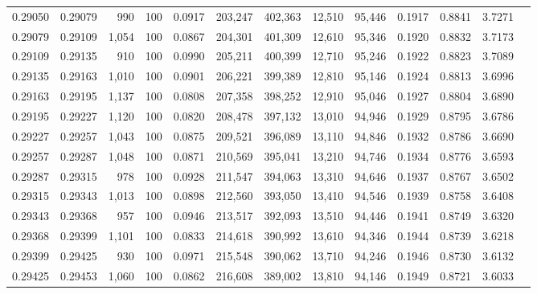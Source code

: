 \begin{tabular}{rrrrrrrrrrrrr}
0.29050 & 0.29079 &   990 & 100 &                                     0.0917 & 203,247 & 402,363 &  12,510 &  95,446 & 0.1917 & 0.8841 & 3.7271 \\
0.29079 & 0.29109 & 1,054 & 100 &                                     0.0867 & 204,301 & 401,309 &  12,610 &  95,346 & 0.1920 & 0.8832 & 3.7173 \\
0.29109 & 0.29135 &   910 & 100 &                                     0.0990 & 205,211 & 400,399 &  12,710 &  95,246 & 0.1922 & 0.8823 & 3.7089 \\
0.29135 & 0.29163 & 1,010 & 100 &                                     0.0901 & 206,221 & 399,389 &  12,810 &  95,146 & 0.1924 & 0.8813 & 3.6996 \\
0.29163 & 0.29195 & 1,137 & 100 &                                     0.0808 & 207,358 & 398,252 &  12,910 &  95,046 & 0.1927 & 0.8804 & 3.6890 \\
0.29195 & 0.29227 & 1,120 & 100 &                                     0.0820 & 208,478 & 397,132 &  13,010 &  94,946 & 0.1929 & 0.8795 & 3.6786 \\
0.29227 & 0.29257 & 1,043 & 100 &                                     0.0875 & 209,521 & 396,089 &  13,110 &  94,846 & 0.1932 & 0.8786 & 3.6690 \\
0.29257 & 0.29287 & 1,048 & 100 &                                     0.0871 & 210,569 & 395,041 &  13,210 &  94,746 & 0.1934 & 0.8776 & 3.6593 \\
0.29287 & 0.29315 &   978 & 100 &                                     0.0928 & 211,547 & 394,063 &  13,310 &  94,646 & 0.1937 & 0.8767 & 3.6502 \\
0.29315 & 0.29343 & 1,013 & 100 &                                     0.0898 & 212,560 & 393,050 &  13,410 &  94,546 & 0.1939 & 0.8758 & 3.6408 \\
0.29343 & 0.29368 &   957 & 100 &                                     0.0946 & 213,517 & 392,093 &  13,510 &  94,446 & 0.1941 & 0.8749 & 3.6320 \\
0.29368 & 0.29399 & 1,101 & 100 &                                     0.0833 & 214,618 & 390,992 &  13,610 &  94,346 & 0.1944 & 0.8739 & 3.6218 \\
0.29399 & 0.29425 &   930 & 100 &                                     0.0971 & 215,548 & 390,062 &  13,710 &  94,246 & 0.1946 & 0.8730 & 3.6132 \\
0.29425 & 0.29453 & 1,060 & 100 &                                     0.0862 & 216,608 & 389,002 &  13,810 &  94,146 & 0.1949 & 0.8721 & 3.6033 \\

\end{tabular}
